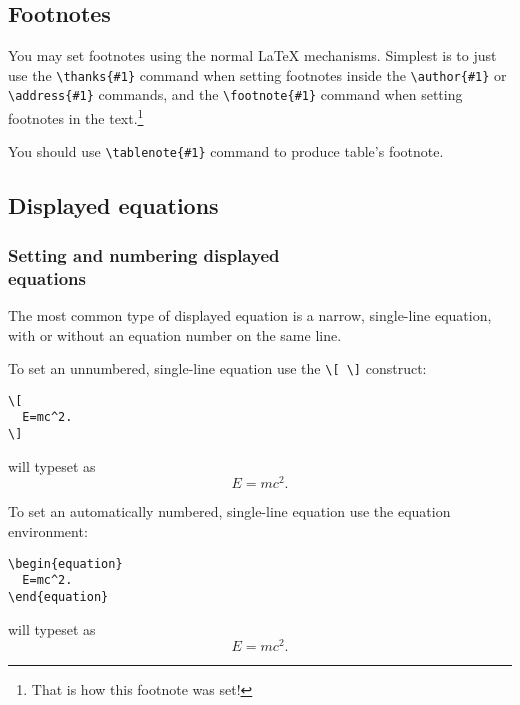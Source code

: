 \subsection{Footnotes}
You may set footnotes using the normal \LaTeX{} mechanisms. Simplest is to
just use the \verb+\thanks{#1}+ command when setting footnotes inside
the  \verb+\author{#1}+ or \verb+\address{#1}+ commands, and the
\verb+\footnote{#1}+ command when setting footnotes in the text.\footnote{That
is how this footnote was set!}

You should use \verb+\tablenote{#1}+ command to produce table's footnote.

\subsection{Displayed equations}
\subsubsection[Setting and numbering displayed equation]{Setting and numbering
displayed\protect\\ equations}


The most common type of displayed equation
is a narrow, single-line equation, with or without an equation
number on the same line.

To set an unnumbered, single-line equation use the \verb+\[ \]+  construct:
\se\begin{verbatim}
\[
  E=mc^2.
\]
\end{verbatim} \ee\noindent
will typeset as
\se\[
E=mc^2.  
\] \ee

To set an automatically numbered, single-line equation use the equation
environment:
\se\begin{verbatim}
\begin{equation}
  E=mc^2.
\end{equation}
\end{verbatim} \ee\noindent
will typeset as
\se\begin{equation}
E=mc^2.
\end{equation}\ee\noindent

